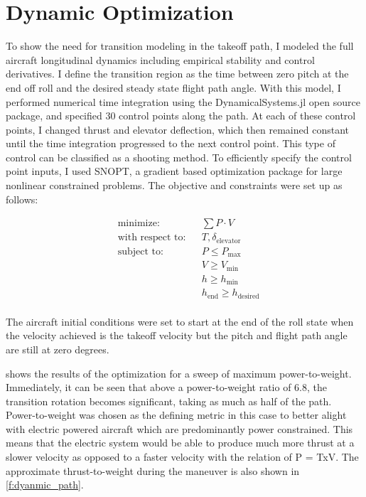\documentclass[10pt,english]{article}
\begin{document}
\section{Dynamic Optimization}
To show the need for transition modeling in the takeoff path, I modeled the full aircraft longitudinal dynamics\cite{beard} including empirical stability and control derivatives\cite{aerosonde}.  I define the transition region as the time between zero pitch at the end off roll and the desired steady state flight path angle.  With this model, I performed numerical time integration using the DynamicalSystems.jl open source package, and specified 30 control points along the path.  At each of these control points, I changed thrust and elevator deflection, which then remained constant until the time integration progressed to the next control point.  This type of control can be classified as a shooting method.  To efficiently specify the control point inputs, I used SNOPT\cite{snopt}, a gradient based optimization package for large nonlinear constrained problems.  The objective and constraints were set up as follows:

\[
\begin{aligned}
& \text{minimize:} & & \sum{P \cdot V} \\
& \text{with respect to:} & & T, \delta_\text{elevator}\\
& \text{subject to:}
& &  \displaystyle P \leq P_{\text{max}}  \\
& & & \displaystyle V \geq V_{\text{min}}  \\
& & & \displaystyle h \geq h_{\text{min}}  \\
& & & \displaystyle h_\text{end} \geq h_{\text{desired}}  \\
\end{aligned}
\]


\vspace{10pt}
\noindent The aircraft initial conditions were set to start at the end of the roll state when the velocity achieved is the takeoff velocity but the pitch and flight path angle are still at zero degrees.

 shows the results of the optimization for a sweep of maximum power-to-weight.  Immediately, it can be seen that above a power-to-weight ratio of 6.8, the transition rotation becomes significant, taking as much as half of the path.  Power-to-weight was chosen as the defining metric in this case to better alight with electric powered aircraft which are predominantly power constrained.  This means that the electric system would be able to produce much more thrust at a slower velocity as opposed to a faster velocity with the relation of P = TxV.  The approximate thrust-to-weight during the maneuver is also shown in \cref{f:dyanmic_path}.
\end{document}
